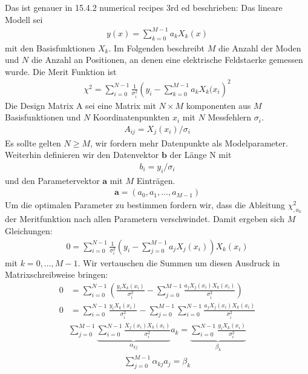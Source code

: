 \documentclass[DIV19,twocolumn]{scrartcl}
\newcommand{\vect}[1]{\mathbf{#1}}
\renewcommand{\a}{\vect a}
\def\a{\vect a}
\def\b{\vect b}
\def\({\left(}
\def\){\right)}
\begin{document}
Das ist genauer in 15.4.2 numerical recipes 3rd ed beschrieben:
Das lineare Modell sei
\begin{align}
  y(x) = \sum_{k=0}^{M-1} a_k X_k(x)
\end{align}
mit den Basisfunktionen $X_k$. Im Folgenden beschreibt $M$ die Anzahl
der Moden und $N$ die Anzahl an Positionen, an denen eine elektrische
Feldstaerke gemessen wurde. Die Merit Funktion ist
\begin{align}
  \chi^2 = \sum_{i=0}^{N-1}\frac{1}{\sigma_i^2}\(y_i- \sum_{k=0}^{M-1} a_k X_k(x_i\)^2
\end{align}
Die Design Matrix A sei eine Matrix mit $N\times M$ komponenten aus
$M$ Basisfunktionen und $N$ Koordinatenpunkten $x_i$ mit $N$
Messfehlern $\sigma_i$.
\begin{align}
  A_{ij} = X_j(x_i)/\sigma_i
\end{align}
Es sollte gelten $N\ge M$, wir fordern mehr Datenpunkte als
Modelparameter. Weiterhin definieren wir den Datenvektor $\b$ der L\"ange N mit
\begin{align}
  b_i = y_i/\sigma_i
\end{align}
und den Parametervektor $\a$ mit $M$ Eintr\"agen.
\begin{align}
  \a = (a_0, a_1,\dots,a_{M-1})
\end{align}
Um die optimalen Parameter zu bestimmen fordern wir, dass die
Ableitung $\chi^2_{,a_k}$ der Meritfunktion nach allen Parametern
verschwindet. Damit ergeben sich $M$ Gleichungen:
\begin{align}
  0 = \sum_{i=0}^{N-1}\frac{1}{\sigma_i^2}\(y_i- \sum_{j=0}^{M-1} a_j X_j(x_i)\) X_k(x_i) 
\end{align}
mit $k=0,\ldots, M-1$.  Wir vertauschen die Summen um diesen
Ausdruck in Matrixschreibweise bringen:
\begin{align}
  0 &= \sum_{i=0}^{N-1}\(\frac{y_iX_k(x_i)}{\sigma_i^2}- \sum_{j=0}^{M-1} \frac{a_j X_j(x_i)X_k(x_i)}{\sigma_i^2}\)   \\
0 &=\sum_{i=0}^{N-1} \frac{y_iX_k(x_i)}{\sigma_i^2}- \sum_{j=0}^{M-1} \sum_{i=0}^{N-1} \frac{a_j X_j(x_i)X_k(x_i)}{\sigma_i^2}
\end{align}
\begin{align}
\sum_{j=0}^{M-1} \underbrace{\sum_{i=0}^{N-1}  \frac{X_j(x_i)X_k(x_i)}{\sigma_i^2}}_{\alpha_{kj}} a_k =  \underbrace{\sum_{i=0}^{N-1}\frac{y_iX_k(x_i)}{\sigma_i^2}}_{\beta_k} 
\end{align}
\begin{align}
  \sum_{j=0}^{M-1} \alpha_{kj} a_j = \beta_k
\end{align}
\end{document}
